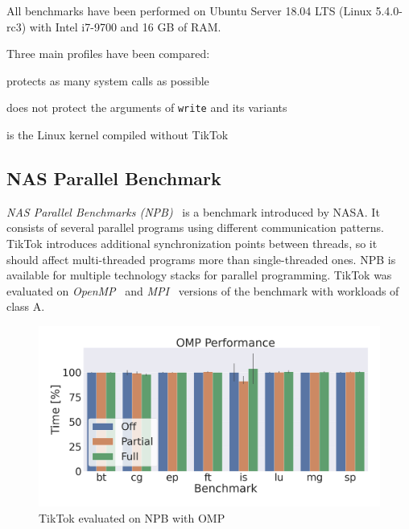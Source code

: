 \documentclass[conference]{IEEEtran}
\newcommand{\sysname}{TikTok}
\begin{document}
All benchmarks have been performed on Ubuntu Server 18.04 LTS (Linux 5.4.0-rc3)
with Intel i7-9700 and 16 GB of RAM.

Three main profiles have been compared:
\begin{LaTeXdescription}
  \item[\sysname{} On] protects as many system calls as possible
  \item[\sysname{} Partial] does not protect the arguments of \texttt{write} and
  its variants
  \item[\sysname{} Off] is the Linux kernel compiled without \sysname{}  
\end{LaTeXdescription}

\subsection{NAS Parallel Benchmark}
\label{subsec:npb}

\emph{NAS Parallel Benchmarks (NPB)}~\cite{npb} is a benchmark introduced by
NASA. It consists of several parallel programs using different communication
patterns. \sysname{} introduces additional synchronization points between
threads, so it should affect multi-threaded programs more than single-threaded
ones. NPB is available for multiple technology stacks for parallel programming.
\sysname{} was evaluated on \emph{OpenMP}~\cite{dagum1998openmp} and
\emph{MPI}~\cite{snir1998mpi} versions of the benchmark with workloads of class
A.

\begin{figure}[]
  \centering
  \includegraphics[width=\linewidth]{graphs/omp.png}
  \caption{\sysname{} evaluated on NPB with OMP}
  \label{fig:npbomp}
\end{figure}
\end{document}
